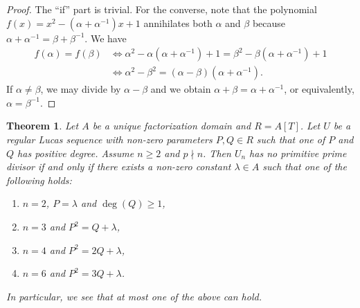 \documentclass[reqno]{amsart}
\newtheorem{theorem}{Theorem}
\begin{document}
\begin{proof}
    The ``if'' part is trivial. For the converse, note that the polynomial $f(x)=x^2-(\alpha+\alpha^{-1})x+1$ annihilates both $\alpha$ and $\beta$ because $\alpha+\alpha^{-1}=\beta+\beta^{-1}$. We have
    \begin{align*}
        f(\alpha)=f(\beta) &\iff \alpha^2-\alpha(\alpha+\alpha^{-1})+1=\beta^2-\beta(\alpha+\alpha^{-1})+1 \\
        &\iff \alpha^2-\beta^2 = (\alpha-\beta)(\alpha+\alpha^{-1}).
    \end{align*}
    If $\alpha\ne \beta$, we may divide by $\alpha-\beta$ and we obtain $\alpha+\beta=\alpha+\alpha^{-1}$, or equivalently, $\alpha=\beta^{-1}$.
\end{proof}





\begin{theorem}
    Let $A$ be a unique factorization domain and $R=A[T]$. Let $U$ be a regular Lucas sequence with non-zero parameters $P,Q\in R$ such that one of $P$ and $Q$ has positive degree. Assume $n\geq 2$ and $p\nmid n$. Then $U_n$ has no primitive prime divisor if and only if there exists a non-zero constant $\lambda \in A$ such that one of the following holds:
    \begin{enumerate}[label=(\arabic*)]
        \item $n=2$, $P=\lambda$ and $\deg{(Q)}\geq 1$,

        \item $n=3$ and $P^2=Q+\lambda$,

        \item $n=4$ and $P^2=2Q+\lambda$,

        \item $n=6$ and $P^2=3Q+\lambda$.
    \end{enumerate}
    In particular, we see that at most one of the above can hold.
\end{theorem}
\end{document}
